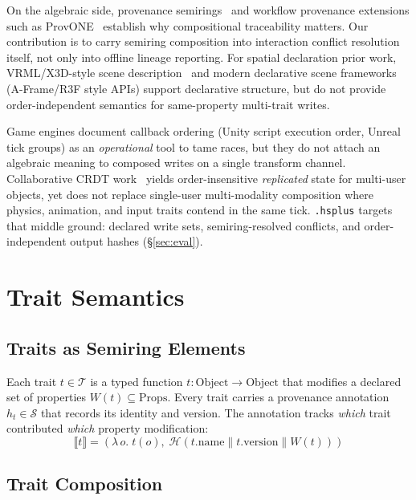\documentclass[sigconf,nonacm]{acmart}
\newcommand{\hsplus}{\texttt{.hsplus}}
\newcommand{\hashfn}{\mathcal{H}}
\newcommand{\provsemiring}{\mathcal{S}}
\newcommand{\traitset}{\mathcal{T}}
\begin{document}
On the algebraic side, provenance semirings~\cite{green-semiring2007}
and workflow provenance extensions such as ProvONE~\cite{provone2014}
establish why compositional traceability matters. Our contribution is to
carry semiring composition into interaction conflict resolution itself,
not only into offline lineage reporting. For spatial declaration prior
work, VRML/X3D-style scene description~\cite{carey1997vrml,brutzman2008x3d}
and modern declarative scene frameworks (A-Frame/R3F style APIs) support
declarative structure, but do not provide order-independent semantics for
same-property multi-trait writes.

Game engines document callback ordering (Unity script execution order,
Unreal tick groups) as an \emph{operational} tool to tame races, but they
do not attach an algebraic meaning to composed writes on a single transform
channel. Collaborative CRDT work~\cite{loro2024,paper-3-crdt-ecoop2027}
yields order-insensitive \emph{replicated} state for multi-user objects,
yet does not replace single-user multi-modality composition where physics,
animation, and input traits contend in the same tick. \hsplus{} targets
that middle ground: declared write sets, semiring-resolved conflicts, and
order-independent output hashes (\S\ref{sec:eval}).

\section{Trait Semantics}
\label{sec:semantics}

\subsection{Traits as Semiring Elements}

Each trait $t \in \traitset$ is a typed function
$t: \text{Object} \to \text{Object}$ that modifies a
declared set of properties $W(t) \subseteq \text{Props}$.
Every trait carries a provenance annotation
$h_t \in \provsemiring$ that records its identity and
version. The annotation tracks \emph{which} trait
contributed \emph{which} property modification:
$$\llbracket t \rrbracket = (\lambda\, o.\; t(o),\;
  \hashfn(t.\text{name} \| t.\text{version} \|
  W(t)))$$

\subsection{Trait Composition}
\end{document}
